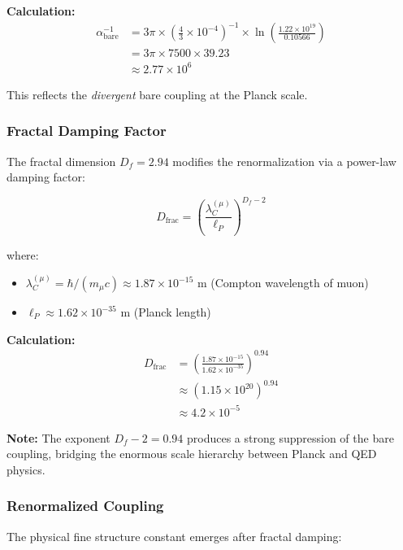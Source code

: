 \documentclass[12pt,a4paper]{article}
\numberwithin{equation}{section}
\begin{document}
\textbf{Calculation:}
\begin{align}
	\alpha_{\text{bare}}^{-1} &= 3\pi \times \left(\frac{4}{3} \times 10^{-4}\right)^{-1} \times \ln\left(\frac{1.22 \times 10^{19}}{0.10566}\right)\\
	&= 3\pi \times 7500 \times 39.23\\
	&\approx 2.77 \times 10^6
	\label{eq:bare_calculation}
\end{align}

This reflects the \emph{divergent} bare coupling at the Planck scale.

\subsubsection{Fractal Damping Factor}

The fractal dimension $D_f = 2.94$ modifies the renormalization via a power-law damping factor:

\begin{equation}
	D_{\text{frac}} = \left(\frac{\lambda_C^{(\mu)}}{\ell_P}\right)^{D_f - 2}
	\label{eq:damping_definition}
\end{equation}

where:
\begin{itemize}
	\item $\lambda_C^{(\mu)} = \hbar / (m_\mu c) \approx 1.87 \times 10^{-15}$ m (Compton wavelength of muon)
	\item $\ell_P \approx 1.62 \times 10^{-35}$ m (Planck length)
\end{itemize}

\textbf{Calculation:}
\begin{align}
	D_{\text{frac}} &= \left(\frac{1.87 \times 10^{-15}}{1.62 \times 10^{-35}}\right)^{0.94}\\
	&\approx (1.15 \times 10^{20})^{0.94}\\
	&\approx 4.2 \times 10^{-5}
	\label{eq:damping_calculation}
\end{align}

\textbf{Note:} The exponent $D_f - 2 = 0.94$ produces a strong suppression of the bare coupling, bridging the enormous scale hierarchy between Planck and QED physics.

\subsubsection{Renormalized Coupling}

The physical fine structure constant emerges after fractal damping:
\end{document}
